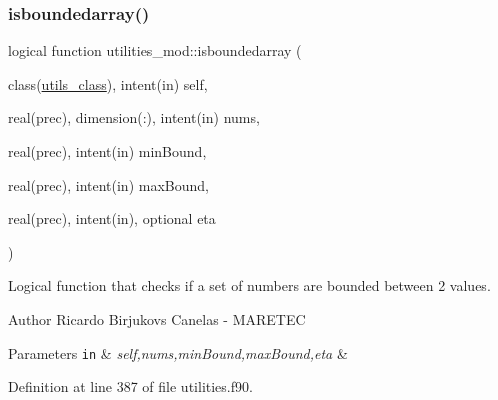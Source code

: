 \subsubsection{\texorpdfstring{isboundedarray()}{isboundedarray()}}
{\footnotesize\ttfamily logical function utilities\+\_\+mod\+::isboundedarray (\begin{DoxyParamCaption}\item[{class(\mbox{\hyperlink{structutilities__mod_1_1utils__class}{utils\+\_\+class}}), intent(in)}]{self,  }\item[{real(prec), dimension(\+:), intent(in)}]{nums,  }\item[{real(prec), intent(in)}]{min\+Bound,  }\item[{real(prec), intent(in)}]{max\+Bound,  }\item[{real(prec), intent(in), optional}]{eta }\end{DoxyParamCaption})\hspace{0.3cm}{\ttfamily [private]}}



Logical function that checks if a set of numbers are bounded between 2 values. 

\begin{DoxyAuthor}{Author}
Ricardo Birjukovs Canelas -\/ M\+A\+R\+E\+T\+EC 
\end{DoxyAuthor}

\begin{DoxyParams}[1]{Parameters}
\mbox{\tt in}  & {\em self,nums,min\+Bound,max\+Bound,eta} & \\
\hline
\end{DoxyParams}


Definition at line 387 of file utilities.\+f90.


